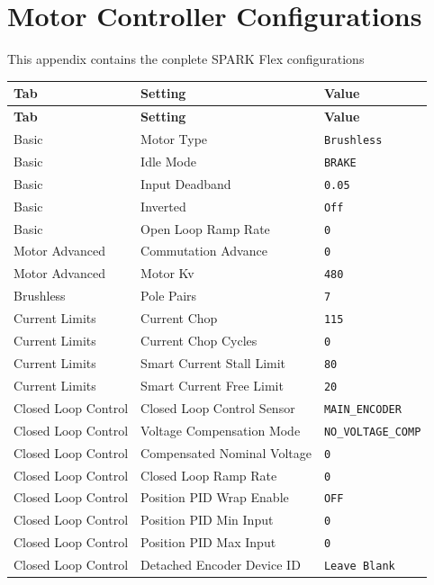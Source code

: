 \section{Motor Controller Configurations}
\pagestyle{fancy}
\fancyhf{}
\label{app:motor-config}
This appendix contains the conplete SPARK Flex configurations

\begin{longtable}{p{3.5cm} p{8cm} p{3cm}}


\toprule
\rowcolor{sbotblue!15}
\textbf{Tab} & \textbf{Setting} & \textbf{Value} \\
\midrule
\endfirsthead

\toprule
\rowcolor{sbotblue!15}
\textbf{Tab} & \textbf{Setting} & \textbf{Value} \\
\midrule
\endhead

\bottomrule
\endfoot

Basic & Motor Type & \texttt{Brushless} \\
Basic & Idle Mode & \texttt{BRAKE} \\
Basic & Input Deadband & \texttt{0.05} \\
Basic & Inverted & \texttt{Off} \\
Basic & Open Loop Ramp Rate & \texttt{0} \\

Motor Advanced & Commutation Advance & \texttt{0} \\
Motor Advanced & Motor Kv & \texttt{480} \\

Brushless & Pole Pairs & \texttt{7} \\

Current Limits & Current Chop & \texttt{115} \\
Current Limits & Current Chop Cycles & \texttt{0} \\
Current Limits & Smart Current Stall Limit & \texttt{80} \\
Current Limits & Smart Current Free Limit & \texttt{20} \\

Closed Loop Control & Closed Loop Control Sensor & \texttt{MAIN\_ENCODER} \\
Closed Loop Control & Voltage Compensation Mode & \texttt{NO\_VOLTAGE\_COMP} \\
Closed Loop Control & Compensated Nominal Voltage & \texttt{0} \\
Closed Loop Control & Closed Loop Ramp Rate & \texttt{0} \\
Closed Loop Control & Position PID Wrap Enable & \texttt{OFF} \\
Closed Loop Control & Position PID Min Input & \texttt{0} \\
Closed Loop Control & Position PID Max Input & \texttt{0} \\
Closed Loop Control & Detached Encoder Device ID & \texttt{Leave Blank} \\


\end{longtable}
